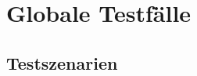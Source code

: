 \section{Globale Testfälle}

\renewcommand{\arraystretch}{1.24}  %
\setlength{\LTpre}{3pt}  %
\setlength{\LTpost}{0pt} %

\newenvironment{usecase}[2]{
	\subsubsection*{#1}  
	\addcontentsline{toc}{subsubsection}{#1} 
	\vspace{-\baselineskip}\textbf{Ausgangs-Stand: } #2
	\begin{longtable}{|p{.44\linewidth}|p{.55\linewidth}|}
		\hhline{|=|=|}
		\textbf{Aktion} & \textbf{Reaktion} \\
		\hline 
		\endfirsthead
		
		\hline
		\textbf{Aktion} & \textbf{Reaktion} \\
		\endhead
		
		\hhline{|=|=|}
		\endlastfoot
}{
	\end{longtable} \vspace{-12pt}
}

\newenvironment{tblitemize}{
	\begin{itemize}[nosep,leftmargin=12pt]
}{
	\end{itemize}\hspace{0pt}\vspace{-\baselineskip}
}

\newcommand{\lA}[1]{\label{A#1}A#1}

\newcommand{\refA}[1]{\hyperref[A#1]{/A#1/}}



\subsection{Testszenarien}







